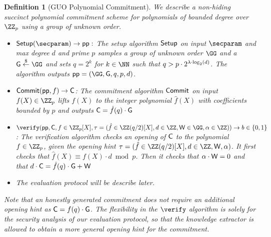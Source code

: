 \documentclass[12pt]{article}
\theoremstyle{Definition}
\newtheorem{definition}{Definition}
\begin{document}
\begin{definition}[GUO Polynomial Commitment]
We describe a non-hiding succinct polynomial commitment scheme for polynomials of bounded degree over $\ZZ_p$ using a group of unknown order.
\begin{itemize}
	\item $\setup(\secparam) \rightarrow \crs:$
The setup algorithm $\textsf{{Setup}}$ on input $\secparam$ and max degree $d$ and prime $p$ samples a group of unknown order $\GG$ and a $\Generator \sample \GG$ and sets $q=2^k$ for $k \in \NN$ such that $q>p\cdot 2^{\lambda \cdot \log_2(d)}$. The algorithm outputs $\crs=(\GG,\Generator,q,p,d)$.

\item $\textsf{{Commit}}(\textsf{pp}, f) \rightarrow \mathsf{C}$: The commitment algorithm $\textsf{{Commit}}$ on input $f(X)\in \ZZ_p$ lifts $f(X)$ to the integer polynomial $\hat{f}(X)$ with coefficients bounded by $p$ and outputs $\mathsf{C} =\hat{f}(q) \cdot \mathsf{G}$
\item $\verify(\crs,  \Commitment,f \in \ZZ_p[X],\hint=(\hat{f} \in \ZZ(q/2)[X], d \in \ZZ , \gr{W}\in \GG, \alpha \in \ZZ)) \rightarrow b \in \{0,1\}$: 
The verification algorithm checks an opening of $\mathsf{C}$ to the polynomial $f \in \ZZ_p$, given the opening hint $\hint=(\hat{f}\in \ZZ(q/2)[X],d \in \ZZ,\gr{W}, \alpha)$. It first checks that $\hat{f}(X) \equiv f(X)\cdot d \bmod p$. Then it checks that $\alpha\cdot \mathsf{W}=0$ and that $d \cdot \mathsf{C} =\hat{f}(q)\cdot \mathsf{G} +\mathsf{W}$
\item The evaluation protocol will be describe later.
\end{itemize}
Note that an honestly generated commitment does not require an additional opening hint as $\mathsf{C} = f(q) \cdot \mathsf{G}$. The flexibility in the $\verify$ algorithm is solely for the security analysis of our evaluation protocol, so that the knowledge extractor is allowed to obtain a more general opening hint for the commitment. 
\end{definition}
\end{document}
